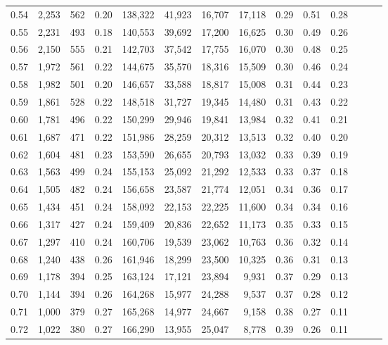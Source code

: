 \begin{tabular}{rrrrrrrrrrrrrr}
0.54 &  2,253 &    562 &  0.20 &  138,322 &   41,923 &  16,707 &  17,118 &  0.29 &  0.51 &      0.28 \\
0.55 &  2,231 &    493 &  0.18 &  140,553 &   39,692 &  17,200 &  16,625 &  0.30 &  0.49 &      0.26 \\
0.56 &  2,150 &    555 &  0.21 &  142,703 &   37,542 &  17,755 &  16,070 &  0.30 &  0.48 &      0.25 \\
0.57 &  1,972 &    561 &  0.22 &  144,675 &   35,570 &  18,316 &  15,509 &  0.30 &  0.46 &      0.24 \\
0.58 &  1,982 &    501 &  0.20 &  146,657 &   33,588 &  18,817 &  15,008 &  0.31 &  0.44 &      0.23 \\
0.59 &  1,861 &    528 &  0.22 &  148,518 &   31,727 &  19,345 &  14,480 &  0.31 &  0.43 &      0.22 \\
0.60 &  1,781 &    496 &  0.22 &  150,299 &   29,946 &  19,841 &  13,984 &  0.32 &  0.41 &      0.21 \\
0.61 &  1,687 &    471 &  0.22 &  151,986 &   28,259 &  20,312 &  13,513 &  0.32 &  0.40 &      0.20 \\
0.62 &  1,604 &    481 &  0.23 &  153,590 &   26,655 &  20,793 &  13,032 &  0.33 &  0.39 &      0.19 \\
0.63 &  1,563 &    499 &  0.24 &  155,153 &   25,092 &  21,292 &  12,533 &  0.33 &  0.37 &      0.18 \\
0.64 &  1,505 &    482 &  0.24 &  156,658 &   23,587 &  21,774 &  12,051 &  0.34 &  0.36 &      0.17 \\
0.65 &  1,434 &    451 &  0.24 &  158,092 &   22,153 &  22,225 &  11,600 &  0.34 &  0.34 &      0.16 \\
0.66 &  1,317 &    427 &  0.24 &  159,409 &   20,836 &  22,652 &  11,173 &  0.35 &  0.33 &      0.15 \\
0.67 &  1,297 &    410 &  0.24 &  160,706 &   19,539 &  23,062 &  10,763 &  0.36 &  0.32 &      0.14 \\
0.68 &  1,240 &    438 &  0.26 &  161,946 &   18,299 &  23,500 &  10,325 &  0.36 &  0.31 &      0.13 \\
0.69 &  1,178 &    394 &  0.25 &  163,124 &   17,121 &  23,894 &   9,931 &  0.37 &  0.29 &      0.13 \\
0.70 &  1,144 &    394 &  0.26 &  164,268 &   15,977 &  24,288 &   9,537 &  0.37 &  0.28 &      0.12 \\
0.71 &  1,000 &    379 &  0.27 &  165,268 &   14,977 &  24,667 &   9,158 &  0.38 &  0.27 &      0.11 \\
0.72 &  1,022 &    380 &  0.27 &  166,290 &   13,955 &  25,047 &   8,778 &  0.39 &  0.26 &      0.11 \\

\end{tabular}
